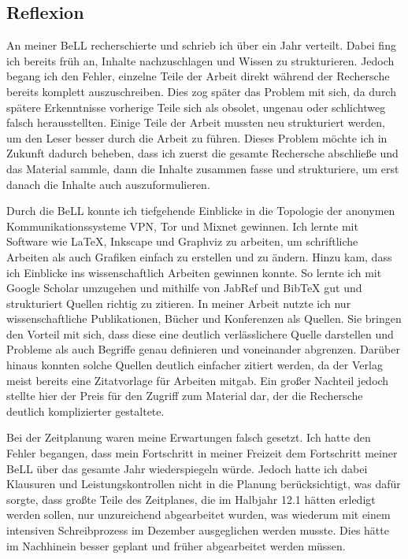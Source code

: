 \subsection{Reflexion}

An meiner BeLL recherschierte und schrieb ich über ein Jahr verteilt. Dabei fing ich bereits früh an, Inhalte nachzuschlagen und Wissen zu strukturieren. Jedoch begang ich den Fehler, einzelne Teile der Arbeit direkt während der Rechersche bereits komplett auszuschreiben. Dies zog später das Problem mit sich, da durch spätere Erkenntnisse vorherige Teile sich als obsolet, ungenau oder schlichtweg falsch herausstellten. Einige Teile der Arbeit mussten neu strukturiert werden, um den Leser besser durch die Arbeit zu führen. Dieses Problem möchte ich in Zukunft dadurch beheben, dass ich zuerst die gesamte Rechersche abschließe und das Material sammle, dann die Inhalte zusammen fasse und strukturiere, um erst danach die Inhalte auch auszuformulieren.

Durch die BeLL konnte ich tiefgehende Einblicke in die Topologie der anonymen Kommunikationssysteme VPN, Tor und Mixnet gewinnen.
Ich lernte mit Software wie LaTeX, Inkscape und Graphviz zu arbeiten, um schriftliche Arbeiten als auch Grafiken einfach zu erstellen und zu ändern. Hinzu kam, dass ich Einblicke ins wissenschaftlich Arbeiten gewinnen konnte. So lernte ich mit Google Scholar umzugehen und mithilfe von JabRef und BibTeX gut und strukturiert Quellen richtig zu zitieren.
In meiner Arbeit nutzte ich nur wissenschaftliche Publikationen, Bücher und Konferenzen als Quellen. Sie bringen den Vorteil mit sich, dass diese eine deutlich verlässlichere Quelle darstellen und Probleme als auch Begriffe genau definieren und voneinander abgrenzen. Darüber hinaus konnten solche Quellen deutlich einfacher zitiert werden, da der Verlag meist bereits eine Zitatvorlage für Arbeiten mitgab. Ein großer Nachteil jedoch stellte hier der Preis für den Zugriff zum Material dar, der die Rechersche deutlich komplizierter gestaltete.

Bei der Zeitplanung waren meine Erwartungen falsch gesetzt. Ich hatte den Fehler begangen, dass mein Fortschritt in meiner Freizeit dem Fortschritt meiner BeLL über das gesamte Jahr wiederspiegeln würde. Jedoch hatte ich dabei Klausuren und Leistungskontrollen nicht in die Planung berücksichtigt, was dafür sorgte, dass großte Teile des Zeitplanes, die im Halbjahr 12.1 hätten erledigt werden sollen, nur unzureichend abgearbeitet wurden, was wiederum mit einem intensiven Schreibprozess im Dezember ausgeglichen werden musste. Dies hätte im Nachhinein besser geplant und früher abgearbeitet werden müssen.
